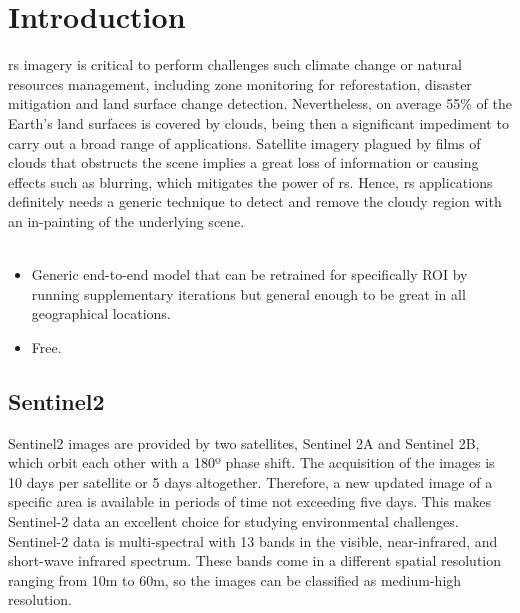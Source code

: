 \documentclass[11pt, a4paper]{article}
\begin{document}
	\section{Introduction} 
	\gls{rs} imagery is critical to perform challenges such climate change or natural resources management, including zone monitoring for reforestation, disaster mitigation and land surface change detection.  %
	Nevertheless, on average 55\% of the Earth's land surfaces is covered by clouds, being then a significant impediment to carry out a broad range of applications. Satellite imagery plagued by films of clouds that obstructs the scene implies a great loss of information or causing effects such as blurring, which mitigates the power of \gls{rs}. Hence, \gls{rs} applications definitely needs a generic technique to detect and remove the cloudy region with an in-painting of the underlying scene.
	\\
	\\
	\begin{itemize}
		\item Generic end-to-end model that can be retrained for specifically ROI by running supplementary iterations but general enough to be great in all geographical locations.
		\item Free.
	\end{itemize}
	\subsection{Sentinel2}
	Sentinel2 images are provided by two satellites, Sentinel 2A and Sentinel 2B, which orbit each other with a 180º phase shift. The acquisition of the images is 10 days per satellite or 5 days altogether. Therefore, a new updated image of a specific area is available in periods of time not exceeding five days. This makes Sentinel-2 data an excellent choice for studying environmental challenges. Sentinel-2 data is multi-spectral with 13 bands in the visible, near-infrared, and short-wave infrared spectrum. These bands come in a different spatial resolution ranging from 10m to 60m, so the images can be classified as medium-high resolution.
\end{document}
